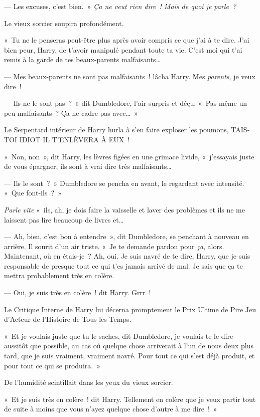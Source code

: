--- Les excuses, c'est bien.~»
\emph{Ça ne veut rien dire~!
Mais de quoi je parle~?}

Le vieux sorcier soupira profondément.

«~Tu ne le penseras peut-être plus après avoir compris ce que j'ai à te dire.
J'ai bien peur, Harry, de t'avoir manipulé pendant toute ta vie.
C'est moi qui t'ai remis à la garde de tes beaux-parents malfaisants…

--- Mes beaux-parents ne sont pas malfaisants~! lâcha Harry.
Mes \emph{parents}, je veux dire~!

--- Ils ne le sont pas~?~»
dit Dumbledore, l'air surpris et déçu.
«~Pas même un peu malfaisants~?
Ça ne cadre pas avec…~»

Le Serpentard intérieur de Harry hurla à s'en faire exploser les poumons, TAIS-TOI IDIOT IL T'ENLÈVERA À EUX~!

«~Non, non~», dit Harry, les lèvres figées en une grimace livide, «~j'essayais juste de vous épargner, ils sont à vrai dire très malfaisants…

--- Ils le sont~?~»
Dumbledore se pencha en avant, le regardant avec intensité.
«~Que font-ils~?~»

\emph{Parle vite} «~ils, ah, je dois faire la vaisselle et laver des problèmes et ils ne me laissent pas lire beaucoup de livres et…

--- Ah, bien, c'est bon à entendre~», dit Dumbledore, se penchant à nouveau en arrière.
Il sourit d'un air triste.
«~Je te demande pardon pour \emph{ça}, alors.
Maintenant, où en étais-je~?
Ah, oui.
Je suis navré de te dire, Harry, que je suis responsable de presque tout ce qui t'es jamais arrivé de mal.
Je sais que ça te mettra probablement très en colère.

--- Oui, je suis très en colère~! dit Harry.
Grrr~!

Le Critique Interne de Harry lui décerna promptement le Prix Ultime de Pire Jeu d'Acteur de l'Histoire de Tous les Temps.

«~Et je voulais juste que tu le saches, dit Dumbledore, je voulais te le dire aussitôt que possible, au cas où quelque chose arriverait à l'un de nous deux plus tard, que je suis vraiment, vraiment navré.
Pour tout ce qui s'est déjà produit, et pour tout ce qui se produira.~»

De l'humidité scintillait dans les yeux du vieux sorcier.

«~Et je suis très en colère~! dit Harry.
Tellement en colère que je veux partir tout de suite à moins que vous n'ayez quelque chose d'autre à me dire~!~»

